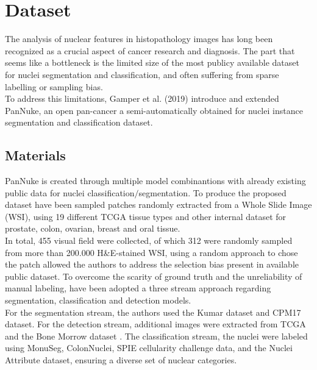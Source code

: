 \documentclass[target=bach,aauheader=,style=]{thud}
\begin{document}
\chapter{Dataset}
The analysis of nuclear features in histopathology images has long been recognized as a crucial aspect of cancer research and diagnosis. The part that seems like a bottleneck is the limited size of the most publicy available dataset for nuclei segmentation and classification, and often suffering from sparse labelling or sampling bias.\\
To address this limitations, Gamper et al. (2019) 
\cite{gamper2019pannuke,gamper2020pannuke} introduce and extended PanNuke, an open pan-cancer a semi-automatically obtained for nuclei instance segmentation and classification dataset.

\section{Materials}
PanNuke is created through multiple model combinantions with already existing public data for nuclei classification$/$segmentation. To produce the proposed dataset have been sampled patches randomly extracted from a Whole Slide Image (WSI), using 19 different TCGA tissue types and other internal dataset for prostate, colon, ovarian, breast and oral tissue.\\
In total, 455 visual field were collected, of which 312 were randomly sampled from more than 200.000 H\&E-stained WSI, using a random approach to chose the patch allowed the authors to address the selection bias present in available public dataset. To overcome the scarity of ground truth and the unreliability of manual labeling, have been adopted a three stream approach regarding segmentation, classification and detection models.\\
For the segmentation stream, the authors used the Kumar \cite{article} dataset and CPM17 \cite{vu2018methodssegmentationclassificationdigital} dataset. For the detection stream, additional images were extracted from TCGA and the Bone Morrow \cite{10.1007/978-3-319-24574-4_33} dataset  . The classification stream, the nuclei were labeled using MonuSeg, ColonNuclei, SPIE cellularity challenge data, and the Nuclei Attribute dataset, ensuring a diverse set of nuclear categories.\\
\end{document}
